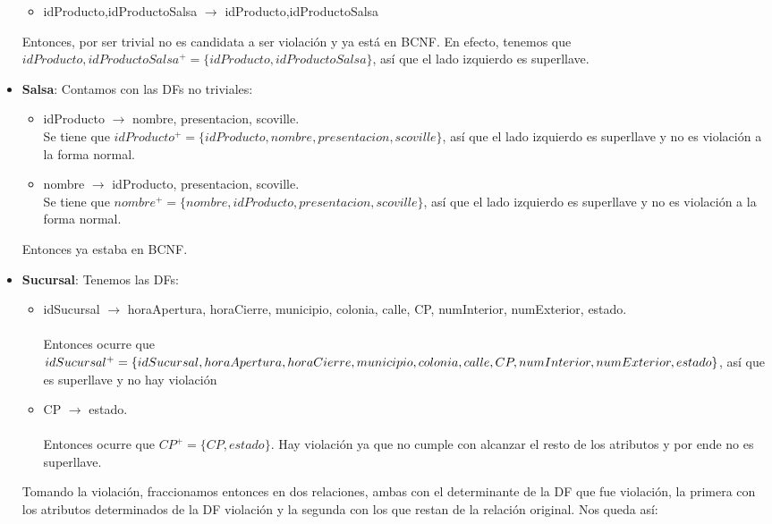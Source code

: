 \documentclass[11pt,letterpaper]{article}
\begin{document}
\begin{itemize}
\begin{itemize}
\item idProducto,idProductoSalsa $\rightarrow$ idProducto,idProductoSalsa
\end{itemize}

Entonces, por ser trivial no es candidata a ser violación y ya está en BCNF. En efecto, tenemos que $idProducto,idProductoSalsa^+ = \{idProducto,idProductoSalsa\}$, así que el lado izquierdo es superllave. \checkmark

\item \textbf{Salsa}: Contamos con las DFs no triviales:

\begin{itemize}
\item idProducto $\rightarrow$ nombre, presentacion, scoville.\\Se tiene que $idProducto^+=\{idProducto,nombre, presentacion, scoville\}$, así que el lado izquierdo es superllave y no es violación a la forma normal. \checkmark
\item nombre $\rightarrow$ idProducto, presentacion, scoville.\\Se tiene que $nombre^+=\{nombre,idProducto, presentacion, scoville\}$, así que el lado izquierdo es superllave y no es violación a la forma normal. \checkmark
\end{itemize}

Entonces ya estaba en BCNF.
\item \textbf{Sucursal}:   Tenemos las DFs:

\begin{itemize}
\item idSucursal $\rightarrow$ horaApertura, horaCierre, municipio, colonia, calle, CP, numInterior, numExterior, estado. \\\\Entonces ocurre que $idSucursal^+ = \{idSucursal,horaApertura, horaCierre, municipio,\\colonia, calle, CP, numInterior, numExterior, estado\}$, así que es superllave y no hay violación \checkmark
\item CP $\rightarrow$ estado. \\\\

Entonces ocurre que $CP^+ = \{CP,estado\}$. Hay violación ya que no cumple con alcanzar el resto de los atributos y por ende no es superllave. 
\end{itemize}

Tomando la violación, fraccionamos entonces en dos relaciones, ambas con el determinante de la DF que fue violación, la primera con los atributos determinados de la DF violación y la segunda con los que restan de la relación original. Nos queda así:


\end{itemize}
\end{document}
